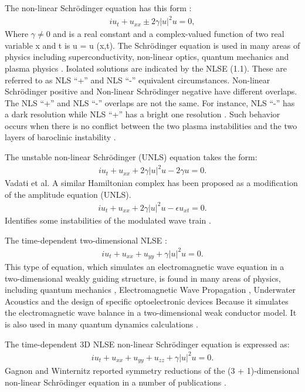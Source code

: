\documentclass[10pt]{NSP1}
\numberwithin{equation}{section}
\begin{document}
The non-linear Schr\"odinger equation has this form \cite{a17}:
\begin{eqnarray}
i u_{t}+u_{\mathit{xx}}\pm 2 \gamma  {| u |}^{2} u = 0,
\end{eqnarray}
Where $\gamma\neq {0}$ and is a real constant and a complex-valued function of two real variable x and t is u = u (x,t). The Schr\"odinger equation is used in many areas of physics including superconductivity, non-linear optics, quantum mechanics and plasma physics \cite{a18}. Isolated solutions are indicated by the NLSE (1.1). These are referred to as NLS ``+'' and NLS ``-'' equivalent circumstances. Non-linear Schr\"odinger positive and Non-linear Schr\"odinger negative have different overlaps. The NLS ``+'' and NLS ``-'' overlaps are not the same. For instance, NLS ``-'' has a dark resolution while NLS ``+'' has a bright one resolution \cite{a19}. Such behavior occurs when there is no conflict between the two plasma instabilities \cite{a20} and the two layers of baroclinic instability \cite{a21}.

The unstable non-linear Schr\"odinger (UNLS) equation takes the form:
\begin{eqnarray}
\mathit{iu}_{t}+u_{\mathit{xx}}+2 \gamma  {| u |}^{2} u -2 \gamma  u =  0.
\end{eqnarray}
Vadati et al.\cite{a22} A similar Hamiltonian complex has been proposed as a modification of the amplitude equation (UNLS).
\begin{eqnarray}
\mathit{iu}_{t}+u_{\mathit{xx}}+2 \gamma  {| u |}^{2} u -\epsilon  u_{\mathit{xt}} =  0.
\end{eqnarray}
Identifies some instabilities of the modulated wave train \cite{a23}.

The time-dependent two-dimensional NLSE :
\begin{eqnarray}
\mathit{iu}_{t}+u_{\mathit{xx}}+u_{\mathit{yy}}+\gamma  {| u |}^{2} u =  0.
\end{eqnarray}
This type of equation, which simulates an electromagnetic wave equation in a two-dimensional weakly guiding structure, is found in many areas of physics, including quantum mechanics \cite{a24}, Electromagnetic Wave Propagation \cite{a25}, Underwater Acoustics \cite{a26} and the design of specific optoelectronic devices \cite{a27} Because it simulates the electromagnetic wave balance in a two-dimensional weak conductor model. It is also used in many quantum dynamics calculations \cite{a28}.

The time-dependent 3D NLSE non-linear Schr\"odinger equation is expressed as:
\begin{eqnarray}
i u_{t}+u_{\mathit{xx}}+u_{\mathit{yy}}+u_{\mathit{zz}}+\gamma  {| u |}^{2} u =  0.
\end{eqnarray}
Gagnon and Winternitz reported symmetry reductions of the (3 + 1)-dimensional non-linear Schr\"odinger equation in a number of publications \cite{a29,a30,a31,a32,a33}.
\end{document}
